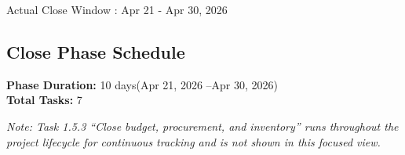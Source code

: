     Actual Close Window : Apr 21 - Apr 30,
    2026

\subsection {
  Close Phase Schedule
}

\noindent\textbf { Phase Duration: }
10 days(Apr 21, 2026 --Apr 30, 2026)
\\\textbf { Total Tasks: }
7

\vspace {
  0.5em
}

\noindent\textit {
Note: Task 1.5.3 ``Close budget, procurement, and inventory'' runs throughout the project lifecycle for continuous tracking and is not shown in this focused view.
}

\vspace { 0.5em }

